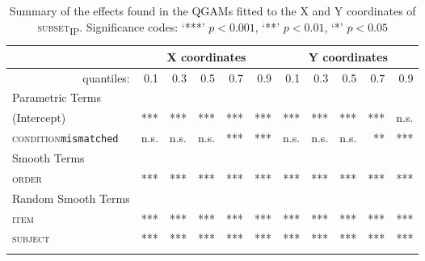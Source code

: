 \begin{table}[H]\fontsize{9}{10}
\caption{Summary of the effects found in the QGAMs fitted to the X and Y coordinates of \textsc{subset\textsubscript{IP}}. Significance codes: `***' $p < 0.001$, `**' $p < 0.01$, `*' $p < 0.05$}
\label{tab:8.6}
\centering
\begin{tabular}{lrrrrrrrrrr}
\lsptoprule
~                   & \multicolumn{5}{c}{X coordinates}                              & \multicolumn{5}{c}{Y coordinates}                               \\
\midrule
\multicolumn{1}{r}{quantiles:}          & 0.1        & 0.3        & 0.5        & 0.7        & 0.9        & 0.1        & 0.3        & 0.5        & 0.7        & 0.9         \\
\midrule
Parametric Terms    & \textbf{~} & \textbf{~} & \textbf{~} & \textbf{~} & \textbf{~} & \textbf{~} & \textbf{~} & \textbf{~} & \textbf{~} & \textbf{~}  \\
\midrule
(Intercept)         & ***        & ***        & ***        & ***        & ***        & ***        & ***        & ***        & ***        & n.s.          \\
\textsc{condition}\texttt{mismatched} & n.s.       & n.s.          & n.s.        & ***        & ***        & n.s.       & n.s.        & n.s.        & **        & ***         \\
\midrule
Smooth Terms        & \textbf{~} & \textbf{~} & \textbf{~} & \textbf{~} & \textbf{~} & \textbf{~} & \textbf{~} & \textbf{~} & \textbf{~} & \textbf{~}  \\
\midrule
\textsc{order}               & ***        & ***        & ***        & ***        & ***        & ***        & ***        & ***        & ***        & ***         \\
\midrule
Random Smooth Terms & \textbf{~} & \textbf{~} & \textbf{~} & \textbf{~} & \textbf{~} & \textbf{~} & \textbf{~} & \textbf{~} & \textbf{~} & \textbf{~}  \\
\midrule
\textsc{item}                & ***        & ***        & ***        & ***        & ***        & ***        & ***        & ***        & ***        & ***         \\
\textsc{subject}             & ***        & ***        & ***        & ***        & ***        & ***        & ***        & ***        & ***        & ***        \\
\lspbottomrule
\end{tabular}
\end{table}




